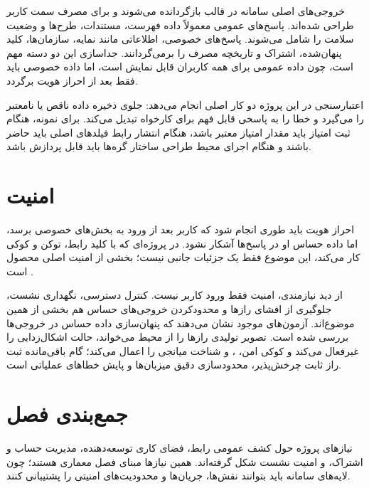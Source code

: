 خروجی‌های اصلی سامانه در قالب  بازگردانده می‌شوند و برای مصرف سمت کاربر طراحی شده‌اند. پاسخ‌های عمومی معمولاً داده فهرست، مستندات، طرح‌ها و وضعیت سلامت را شامل می‌شوند. پاسخ‌های خصوصی، اطلاعاتی مانند نمایه، سازمان‌ها، کلید پنهان‌شده، اشتراک و تاریخچه مصرف را برمی‌گردانند. جداسازی این دو دسته مهم است، چون داده عمومی برای همه کاربران قابل نمایش است، اما داده خصوصی باید فقط بعد از احراز هویت برگردد.

اعتبارسنجی در این پروژه دو کار اصلی انجام می‌دهد: جلوی ذخیره داده ناقص یا نامعتبر را می‌گیرد و خطا را به پاسخی قابل فهم برای کارخواه تبدیل می‌کند. برای نمونه، هنگام ثبت امتیاز باید مقدار امتیاز معتبر باشد، هنگام انتشار رابط فیلدهای اصلی باید حاضر باشند و هنگام اجرای محیط طراحی ساختار گره‌ها باید قابل پردازش باشد.

\section{امنیت}
احراز هویت باید طوری انجام شود که کاربر بعد از ورود به بخش‌های خصوصی برسد، اما داده حساس او در پاسخ‌ها آشکار نشود. در پروژه‌ای که با کلید رابط، توکن و کوکی کار می‌کند، این موضوع فقط یک جزئیات جانبی نیست؛ بخشی از امنیت اصلی محصول است \cite{django,drf}.

از دید نیازمندی، امنیت فقط ورود کاربر نیست. کنترل دسترسی، نگهداری نشست، جلوگیری از افشای رازها و محدودکردن خروجی‌های حساس هم بخشی از همین موضوع‌اند. آزمون‌های موجود نشان می‌دهند که پنهان‌سازی داده حساس در خروجی‌ها بررسی شده است. تصویر تولیدی رازها را از محیط می‌خواند، حالت اشکال‌زدایی را غیرفعال می‌کند و کوکی امن، ،  و شناخت میانجی  را اعمال می‌کند؛ گام باقی‌مانده ثبت راز ثابت چرخش‌پذیر، محدودسازی دقیق میزبان‌ها و پایش خطاهای عملیاتی است.

\section{جمع‌بندی فصل}
نیازهای پروژه حول کشف عمومی رابط، فضای کاری توسعه‌دهنده، مدیریت حساب و اشتراک، و امنیت نشست شکل گرفته‌اند. همین نیازها مبنای فصل معماری هستند؛ چون لایه‌های سامانه باید بتوانند نقش‌ها، جریان‌ها و محدودیت‌های امنیتی را پشتیبانی کنند.
